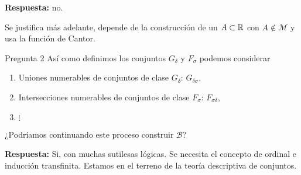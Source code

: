 \textbf{Respuesta:} no.  

Se justifica más adelante, depende de la construcción de un $A\subset\mathbb{R}$ con $A\notin \mathscr{M}$ y usa la función de Cantor. 



Pregunta 2
 Así como definimos los conjuntos $G_{\delta}$ y $F_{\sigma}$ podemos considerar 
\begin{enumerate}
 \item Uniones numerables de conjuntos de clase  $G_{\delta}$:   $G_{\delta\sigma}$,
 \item Intersecciones numerables de conjuntos de clase  $F_{\sigma}$:   $F_{\sigma\delta}$,
 \item $\vdots$
\end{enumerate}
 
¿Podríamos continuando este proceso construir $\mathscr{B}$?
 
 
 \textbf{Respuesta:} Si, con muchas sutilesas lógicas. Se necesita el concepto de ordinal e inducción transfinita.  Estamos en el terreno de la teoría descriptiva de conjuntos.





